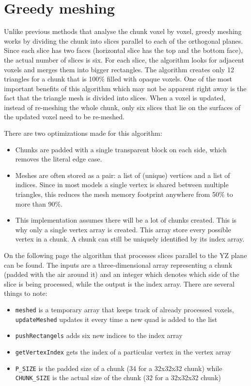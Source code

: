 \documentclass[times, utf8, zavrsni, numeric]{fer}
\begin{document}
\section{Greedy meshing}
Unlike previous methods that analyse the chunk voxel by voxel, greedy meshing works by dividing the chunk into slices parallel to each of the orthogonal planes. Since each slice has two faces (horizontal slice has the top and the bottom face), the actual number of slices is six.
For each slice, the algorithm looks for adjacent voxels and merges them into bigger rectangles. The algorithm creates only 12 triangles for a chunk that is 100\% filled with opaque voxels. One of the most important benefits of this algorithm which may not be apparent right away is the fact that the triangle mesh is divided into slices. When a voxel is updated, instead of re-meshing the whole chunk, only six slices that lie on the surfaces of the updated voxel need to be re-meshed.

There are two optimizations made for this algorithm:
\begin{itemize}
	\item Chunks are padded with a single transparent block on each side, which removes the literal edge case.
	\item Meshes are often stored as a pair: a list of (unique) vertices and a list of indices. Since in most models a single vertex is shared between multiple triangles, this reduces the mesh memory footprint anywhere from 50\% to more than 90\%. 
	\item This implementation assumes there will be a lot of chunks created. This is why only a single vertex array is created. This array store every possible vertex in a chunk. A chunk can still be uniquely identified by its index array.
\end{itemize}

On the following page the algorithm that processes slices parallel to the YZ plane can be found. The inputs are a three-dimensional array representing a chunk (padded with the air around it) and an integer which denotes which side of the slice is being processed, while the output is the index array. There are several things to note:
\begin{itemize}
	\item \texttt{meshed} is a temporary array that keeps track of already processed voxels, \texttt{updateMeshed} updates it every time a new quad is added to the list
	\item \texttt{pushRectangels} adds six new indices to the index array
	\item \texttt{getVertexIndex} gets the index of a particular vertex in the vertex array
	\item \texttt{P\_SIZE} is the padded size of a chunk (34 for a 32x32x32 chunk) while \linebreak \texttt{CHUNK\_SIZE} is the actual size of the chunk (32 for a 32x32x32 chunk)
\end{itemize}
\end{document}
